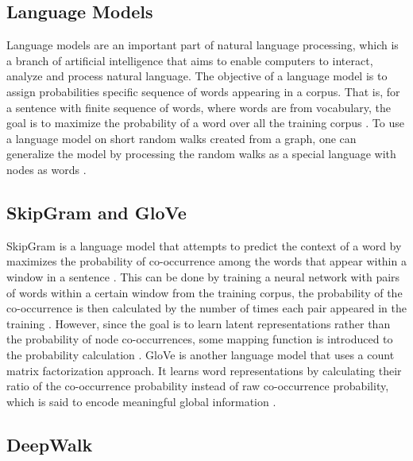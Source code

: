 \subsection{Language Models}

Language models are an important part of natural language processing, which is a branch of artificial intelligence that aims to enable computers to interact, analyze and process natural language. The objective of a language model is to assign probabilities specific sequence of words appearing in a corpus.
That is, for a sentence with finite sequence of words, where words are from vocabulary, the goal is to maximize the probability of a word over all the training corpus \cite{perozzi_deepwalk:_2014}.
To use a language model on short random walks created from a graph, one can generalize the model by processing the random walks as a special language with nodes as words \cite{perozzi_deepwalk:_2014}.

\subsection{SkipGram and GloVe}

SkipGram is a language model that attempts to predict the context of a word by maximizes the probability of co-occurrence among the words that appear within a window in a sentence \cite{perozzi_deepwalk:_2014}. This can be done by training a neural network with pairs of words within a certain window from the training corpus, the probability of the co-occurrence is then calculated by the number of times each pair appeared in the training \cite{mccormick_word2vec_nodate}. However, since the goal is to learn latent representations rather than the probability of node co-occurrences, some mapping function is introduced to the probability calculation \cite{perozzi_deepwalk:_2014}. \ac{GloVe} is another language model that uses a count matrix factorization approach. It learns word representations by calculating their ratio of the co-occurrence probability instead of raw co-occurrence probability, which is said to encode meaningful global information \cite{pennington_glove:_2014}. 

\subsection{DeepWalk}

